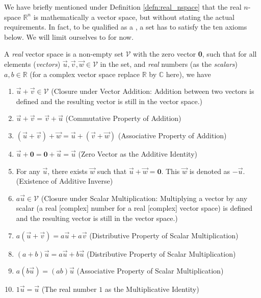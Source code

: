 We have briefly mentioned under Definition \ref{defn:real_nspace} that the real $n$-space $\mathbb{R}^n$ is mathematically a vector space, but without stating the actual requirements. In fact, to be qualified as a , a set has to satisfy the ten axioms below. We will limit ourselves to  for now.
\begin{defn}
\label{defn:realvecspaceaxiom}
A \textit{real} vector space is a non-empty set $\mathcal{V}$ with the zero vector \textbf{0}, such that for all elements (\textit{vectors}) $\vec{u}, \vec{v}, \vec{w} \in \mathcal{V}$ in the set, and \textit{real} numbers (as the \textit{scalars}) $a, b \in \mathbb{R}$ (for a complex vector space replace $\mathbb{R}$ by $\mathbb{C}$ here), we have
\begin{enumerate}
\item $\vec{u} + \vec{v} \in \mathcal{V}$ (Closure under Vector Addition: Addition between two vectors is defined and the resulting vector is still in the vector space.)
\item $\vec{u} + \vec{v} = \vec{v} + \vec{u}$ (Commutative Property of Addition)
\item $(\vec{u} + \vec{v}) + \vec{w} = \vec{u} + (\vec{v} + \vec{w})$ (Associative Property of Addition)
\item $\vec{u} + \textbf{0} = \textbf{0} + \vec{u} = \vec{u}$ (Zero Vector as the Additive Identity)
\item For any $\vec{u}$, there exists $\vec{w}$ such that $\vec{u} + \vec{w} = \textbf{0}$. This $\vec{w}$ is denoted as $-\vec{u}$. (Existence of Additive Inverse)
\item $a\vec{u} \in \mathcal{V}$ (Closure under Scalar Multiplication: Multiplying a vector by any scalar (a real [complex] number for a real [complex] vector space) is defined and the resulting vector is still in the vector space.)
\item $a(\vec{u} + \vec{v}) = a\vec{u} + a\vec{v}$ (Distributive Property of Scalar Multiplication)
\item $(a+b)\vec{u} = a\vec{u} + b\vec{u}$ (Distributive Property of Scalar Multiplication)
\item $a(b\vec{u}) = (ab)\vec{u}$ (Associative Property of Scalar Multiplication)
\item $1\vec{u} = \vec{u}$ (The real number $1$ as the Multiplicative Identity)
\end{enumerate}
\end{defn}
